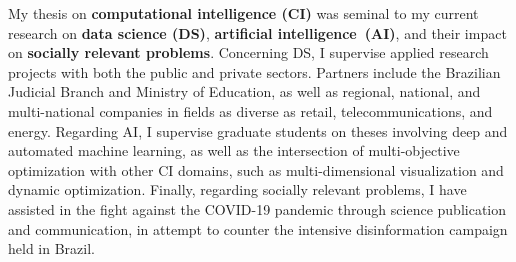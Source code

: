 
My thesis on \textbf{computational intelligence (CI)} was seminal to my current research on \textbf{data science (DS)}, \textbf{artificial intelligence~(AI)}, and their impact on \textbf{socially relevant problems}. Concerning DS, I supervise applied research projects with both the public and private sectors. Partners include the Brazilian Judicial Branch and Ministry of Education, as well as regional, national, and multi-national companies in fields as diverse as retail, telecommunications, and energy. Regarding AI, I supervise graduate students on theses involving deep and automated machine learning, as well as the intersection of multi-objective optimization with other CI domains, such as multi-dimensional visualization and dynamic optimization. Finally, regarding socially relevant problems, I have assisted in the fight against the COVID-19 pandemic through science publication and communication, in attempt to counter the intensive disinformation campaign held in Brazil. 





